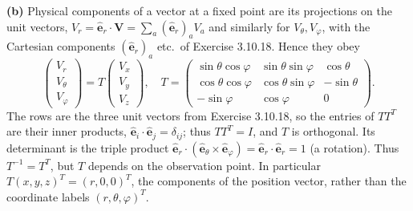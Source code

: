 \textbf{(b)} Physical components of a vector at a fixed point are its
projections on the unit vectors, $V_r=\hat{\mathbf e}_r\cdot\mathbf V
=\sum_a(\hat{\mathbf e}_r)_aV_a$ and similarly for $V_\theta,V_\varphi$,
with the Cartesian components $(\hat{\mathbf e}_r)_a$ etc.\ of
Exercise 3.10.18. Hence they obey
\[
\boxed{\begin{pmatrix}V_r\\V_\theta\\V_\varphi\end{pmatrix}
=T\begin{pmatrix}V_x\\V_y\\V_z\end{pmatrix},\quad
T=\begin{pmatrix}
\sin\theta\cos\varphi&\sin\theta\sin\varphi&\cos\theta\\
\cos\theta\cos\varphi&\cos\theta\sin\varphi&-\sin\theta\\
-\sin\varphi&\cos\varphi&0
\end{pmatrix}}.
\]
The rows are the three unit vectors from Exercise 3.10.18, so the
entries of $TT^T$ are their inner products,
$\hat{\mathbf e}_i\cdot\hat{\mathbf e}_j=\delta_{ij}$; thus $TT^T=I$,
and $T$ is orthogonal. Its determinant is the triple product
$\hat{\mathbf e}_r\cdot(\hat{\mathbf e}_\theta\times\hat{\mathbf e}_\varphi)
=\hat{\mathbf e}_r\cdot\hat{\mathbf e}_r=1$ (a rotation).
Thus $T^{-1}=T^T$, but $T$ depends on the observation point.
In particular $T(x,y,z)^T=(r,0,0)^T$, the components of the
position vector, rather than the coordinate labels $(r,\theta,\varphi)^T$.

